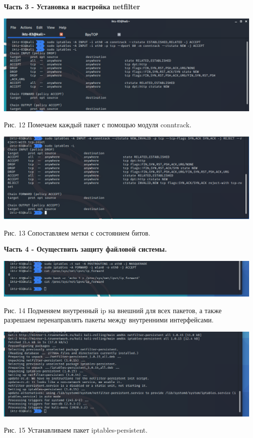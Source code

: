\documentclass[a4paper,14pt]{extarticle}
\begin{document}
   \textbf{Часть 3 - Установка и настройка netfilter}
   \begin{center}
       
        \includegraphics[scale=0.45]{pics/12.png}

        Рис. 12 Помечаем каждый пакет с помощью модуля conntrack.

        \includegraphics[scale=0.45]{pics/13.png}

        Рис. 13 Сопоставляем метки с состоянием битов.

   \end{center}

   \textbf{Часть 4 - Осуществить защиту файловой системы.}
   \begin{center}
       
        \includegraphics[scale=0.45]{pics/14.png}

        \begin{singlespace}
            Рис. 14 Подменяем внутренный ip на внешний для всех пакетов, а также разрешаем
            перенаправлять пакеты между внутренними интерфейсами.
        \end{singlespace}

        \includegraphics[scale=0.45]{pics/15.png}

        Рис. 15 Устанавливаем пакет iptables-persistent.

   \end{center}
\end{document}
